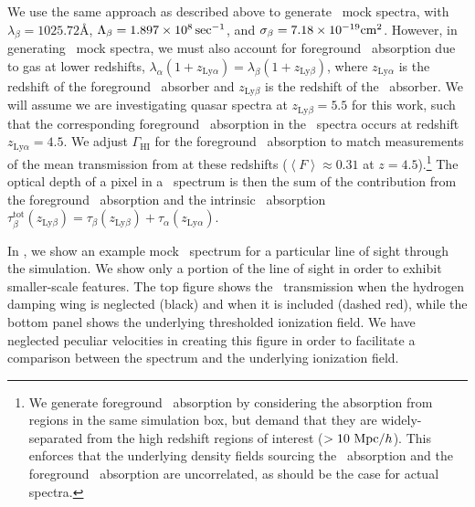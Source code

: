 We use the same approach as described above to generate \lyb\ mock spectra, with $\lambda_{\beta} = 1025.72\text{\AA}$, $\Lambda_\beta = 1.897 \times 10^{8}\sec^{-1}$, and $\sigma_\beta = 7.18 \times 10^{-19}\text{cm}^{2}$. However, in generating \lyb\ mock spectra, we must also account for foreground \lya\ absorption due to gas at lower redshifts, $\lambda_\alpha (1+z_{\text{Ly}\alpha}) = \lambda_{\beta}(1 + z_{\text{Ly}\beta})$, where $z_{\text{Ly}\alpha}$ is the redshift of the foreground \lya\ absorber and $z_{\text{Ly}\beta}$ is the redshift of the \lyb\ absorber. We will assume we are investigating quasar spectra at $z_{\text{Ly}\beta} =  5.5$ for this work, such that the corresponding foreground \lya\ absorption in the \lyb\ spectra occurs at redshift $z_{\text{Ly}\alpha} = 4.5$. We adjust $\Gamma_{\text{HI}}$ for the foreground \lya\ absorption to match measurements of the mean transmission from \cite{2013MNRAS.430.2067B} at these redshifts ($\left\langle F \right\rangle \approx 0.31$ at $z = 4.5$).\footnote{We generate foreground \lya\ absorption by considering the absorption from regions in the same simulation box, but demand that they are widely-separated from the high redshift regions of interest ($>10\ \text{Mpc/$h$}$). This enforces that the underlying density fields sourcing the \lyb\ absorption and the foreground \lya\ absorption are uncorrelated, as should be the case for actual spectra.} The optical depth of a pixel in a \lyb\ spectrum is then the sum of the contribution from the foreground \lya\ absorption and the intrinsic \lyb\ absorption $\tau_\beta^{\text{tot}}(z_{\text{Ly}\beta}) = \tau_{\beta}(z_{\text{Ly}\beta}) + \tau_{\alpha}(z_{\text{Ly}\alpha})$.


In , we show an example mock \lya\ spectrum for a particular line of sight through the simulation. We show only a portion of the line of sight in order to exhibit smaller-scale features. The top figure shows the \lya\ transmission when the hydrogen damping wing is neglected (black) and when it is included (dashed red), while the bottom panel shows the underlying thresholded ionization field. We have neglected peculiar velocities in creating this figure in order to facilitate a comparison between the spectrum and the underlying ionization field. 


